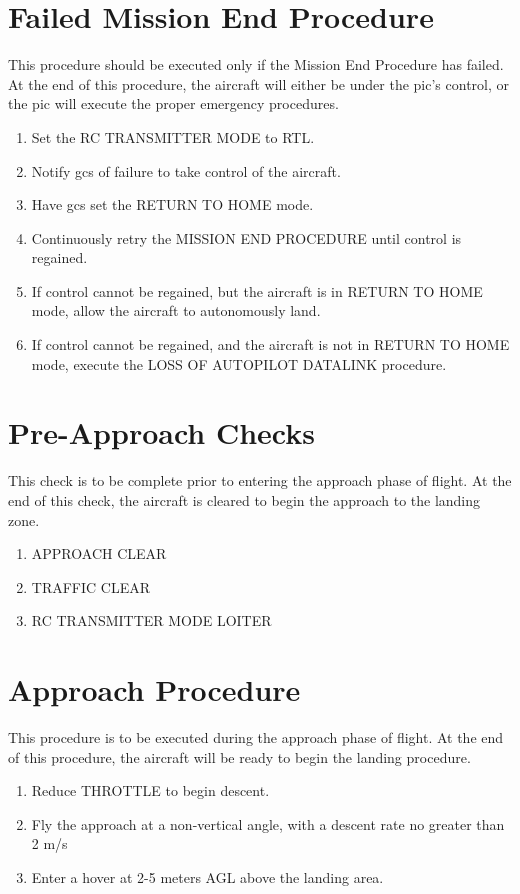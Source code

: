 \documentclass{report}
\begin{document}
	\section{Failed Mission End Procedure}
		This procedure should be executed only if the Mission End Procedure has failed.  At the end of this procedure, the aircraft will either be under the \gls{pic}'s control, or the \gls{pic} will execute the proper emergency procedures.
		\begin{enumerate}
			\item Set the RC TRANSMITTER MODE to RTL.
			\item Notify \gls{gcs} of failure to take control of the aircraft.
			\item Have \gls{gcs} set the RETURN TO HOME mode.
			\item Continuously retry the MISSION END PROCEDURE until control is regained.
			\item If control cannot be regained, but the aircraft is in RETURN TO HOME mode, allow the aircraft to autonomously land.
			\item If control cannot be regained, and the aircraft is not in RETURN TO HOME mode, execute the LOSS OF AUTOPILOT DATALINK procedure.
		\end{enumerate}
	\section{Pre-Approach Checks}
		This check is to be complete prior to entering the approach phase of flight.  At the end of this check, the aircraft is cleared to begin the approach to the landing zone.
		\begin{enumerate}
			\item APPROACH \hrulefill CLEAR
			\item TRAFFIC \hrulefill CLEAR
			\item RC TRANSMITTER MODE \hrulefill LOITER
		\end{enumerate}
	\section{Approach Procedure}
		This procedure is to be executed during the approach phase of flight.  At the end of this procedure, the aircraft will be ready to begin the landing procedure.
		\begin{enumerate}
			\item Reduce THROTTLE to begin descent.
			\item Fly the approach at a non-vertical angle, with a descent rate no greater than 2 m/s
			\item Enter a hover at 2-5 meters AGL above the landing area.
		\end{enumerate}
\end{document}

